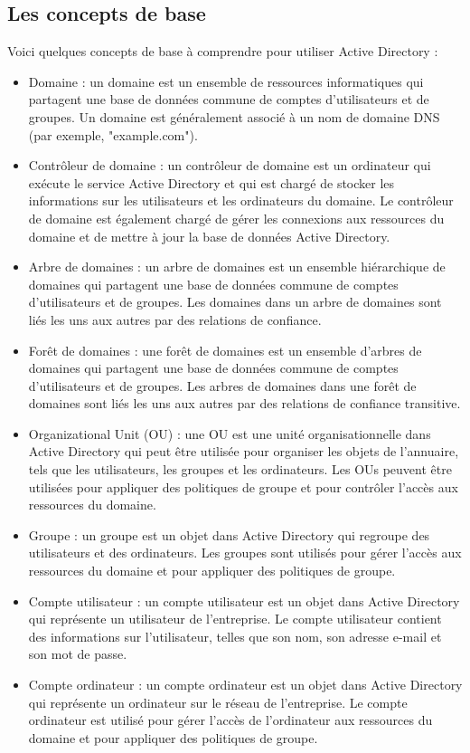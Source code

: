 \documentclass[12pt, a4paper]{article}
\begin{document}
\subsection{Les concepts de base}
Voici quelques concepts de base à comprendre pour utiliser Active Directory :\\
\begin{itemize}
    \item Domaine : un domaine est un ensemble de ressources informatiques qui partagent une base de données commune de comptes d'utilisateurs et de groupes. Un domaine est généralement associé à un nom de domaine DNS (par exemple, "example.com").
    \item Contrôleur de domaine : un contrôleur de domaine est un ordinateur qui exécute le service Active Directory et qui est chargé de stocker les informations sur les utilisateurs et les ordinateurs du domaine. Le contrôleur de domaine est également chargé de gérer les connexions aux ressources du domaine et de mettre à jour la base de données Active Directory.
    \item Arbre de domaines : un arbre de domaines est un ensemble hiérarchique de domaines qui partagent une base de données commune de comptes d'utilisateurs et de groupes. Les domaines dans un arbre de domaines sont liés les uns aux autres par des relations de confiance.
    \item Forêt de domaines : une forêt de domaines est un ensemble d'arbres de domaines qui partagent une base de données commune de comptes d'utilisateurs et de groupes. Les arbres de domaines dans une forêt de domaines sont liés les uns aux autres par des relations de confiance transitive.
    \item Organizational Unit (OU) : une OU est une unité organisationnelle dans Active Directory qui peut être utilisée pour organiser les objets de l'annuaire, tels que les utilisateurs, les groupes et les ordinateurs. Les OUs peuvent être utilisées pour appliquer des politiques de groupe et pour contrôler l'accès aux ressources du domaine.
    \item Groupe : un groupe est un objet dans Active Directory qui regroupe des utilisateurs et des ordinateurs. Les groupes sont utilisés pour gérer l'accès aux ressources du domaine et pour appliquer des politiques de groupe.
    \item Compte utilisateur : un compte utilisateur est un objet dans Active Directory qui représente un utilisateur de l'entreprise. Le compte utilisateur contient des informations sur l'utilisateur, telles que son nom, son adresse e-mail et son mot de passe.
    \item Compte ordinateur : un compte ordinateur est un objet dans Active Directory qui représente un ordinateur sur le réseau de l'entreprise. Le compte ordinateur est utilisé pour gérer l'accès de l'ordinateur aux ressources du domaine et pour appliquer des politiques de groupe.

\end{itemize}
\end{document}
